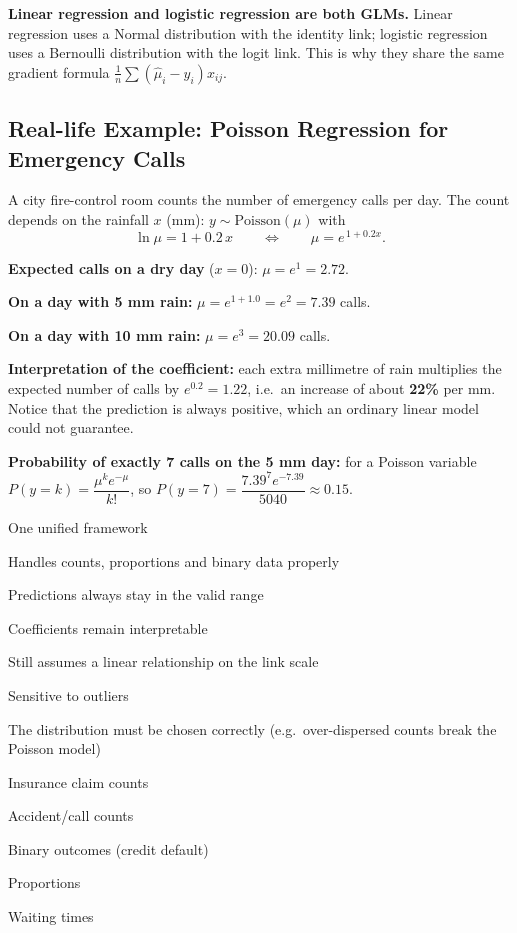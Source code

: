 \begin{keyidea}
\textbf{Linear regression and logistic regression are both GLMs.} Linear regression uses a Normal distribution with the identity link; logistic regression uses a Bernoulli distribution with the logit link. This is why they share the same gradient formula $\frac1n\sum(\hat\mu_i-y_i)x_{ij}$.
\end{keyidea}

\subsection{Real-life Example: Poisson Regression for Emergency Calls}

A city fire-control room counts the number of emergency calls per day. The count depends on the rainfall $x$ (mm): $y\sim\text{Poisson}(\mu)$ with
\[
  \ln\mu=1+0.2\,x\qquad\Longleftrightarrow\qquad\mu=e^{\,1+0.2x}.
\]

\begin{example}
\textbf{Expected calls on a dry day} ($x=0$): $\mu=e^{1}=2.72$.\par
\textbf{On a day with 5 mm rain:} $\mu=e^{1+1.0}=e^{2}=7.39$ calls.\par
\textbf{On a day with 10 mm rain:} $\mu=e^{3}=20.09$ calls.\par
\textbf{Interpretation of the coefficient:} each extra millimetre of rain multiplies the expected number of calls by $e^{0.2}=1.22$, i.e.\ an increase of about \textbf{22\%} per mm. Notice that the prediction is always positive, which an ordinary linear model could not guarantee.\par
\textbf{Probability of exactly 7 calls on the 5 mm day:} for a Poisson variable $P(y=k)=\dfrac{\mu^ke^{-\mu}}{k!}$, so $P(y=7)=\dfrac{7.39^{7}e^{-7.39}}{5040}\approx0.15$.
\end{example}

{\item One unified framework
 \item Handles counts, proportions and binary data properly
 \item Predictions always stay in the valid range
 \item Coefficients remain interpretable}
{\item Still assumes a linear relationship on the link scale
 \item Sensitive to outliers
 \item The distribution must be chosen correctly (e.g.\ over-dispersed counts break the Poisson model)}
{\item Insurance claim counts
 \item Accident/call counts
 \item Binary outcomes (credit default)
 \item Proportions
 \item Waiting times}

